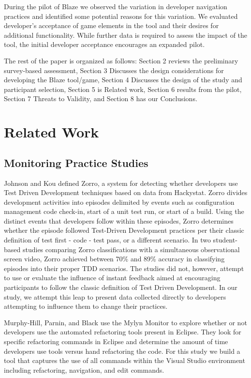 \documentclass{sig-alternate}
\begin{document}
During the pilot of Blaze we observed the variation in developer navigation practices and identified some potential reasons for this variation.  We evaluated developer's acceptance of game elements in the tool and their desires for additional functionality.  While further data is required to assess the impact of the tool, the initial developer acceptance encourages an expanded pilot.

The rest of the paper is organized as follows:  Section 2 reviews the preliminary survey-based assessment, Section 3 Discusses the design considerations for developing the Blaze tool/game, Section 4 Discusses the design of the study and participant selection, Section 5 is Related work, Section 6 results from the pilot, Section 7 Threats to Validity, and Section 8 has our Conclusions.


\section{Related Work}
\subsection{Monitoring Practice Studies }
Johnson and Kou defined Zorro\cite{V:Johnson2007Automated}, a system for detecting whether developers use Test Driven Development techniques based on data from Hackystat.  Zorro divides development activities into episodes delimited by events such as configuration management code check-in, start of a unit test run, or start of a build.  Using the distinct events that developers follow within these episodes, Zorro determines whether the episode followed Test-Driven Development practices per their classic definition of test first - code - test pass, or a different scenario.  In two student-based studies comparing Zorro classifications with a simultaneous observational screen video, Zorro achieved between 70\% \cite{Kou2010Operational} and 89\% \cite{V:Johnson2007Automated} accuracy in classifying episodes into their proper TDD scenarios.  The studies did not, however, attempt to use or evaluate the influence of instant feedback aimed at encouraging participants to follow the classic definition of Test Driven Development.  In our study, we attempt this leap to present data collected directly to developers attempting to influence them to change their practices.

Murphy-Hill, Parnin, and Black \cite{V:MurphyHill2012How} use the Mylyn Monitor to explore whether or not developers use the automated refactoring tools present in Eclipse.  They look for specific refactoring commands in Eclipse and determine the amount of time developers use tools versus hand refactoring the code.  For this study we build a tool that captures the use of all commands within the Visual Studio environment including refactoring, navigation, and edit commands.
\end{document}
